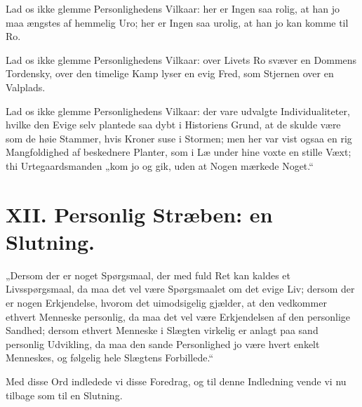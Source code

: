 \documentclass[12pt,a4paper]{book}
\newcommand{\apage}[1]{\marginnote{\footnotesize\textit{[#1]}}}
\begin{document}
Lad os ikke glemme Personlighedens Vilkaar: her er Ingen saa rolig, at
han jo maa ængstes af hemmelig Uro; her er Ingen saa urolig, at han jo
kan komme til Ro.

Lad os ikke glemme Personlighedens Vilkaar: over Livets Ro svæver en
Dommens Tordensky, over den timelige Kamp lyser en evig Fred, som
Stjernen over en Valplads.

Lad os ikke glemme Personlighedens Vilkaar: der vare udvalgte
Individualiteter, hvilke den Evige selv plantede saa dybt i Historiens
Grund, at de skulde være som de høie Stammer, hvis Kroner suse i
Stormen; men her var vist ogsaa en rig Mangfoldighed af beskednere
Planter, som i Læ under hine voxte en stille Væxt; thi Urtegaardsmanden
„kom jo og gik, uden at Nogen mærkede Noget.“

\chapter*{XII. Personlig Stræben: en Slutning.}
\label{ch:forel12}
 \apage{132}

„Dersom der er noget Spørgsmaal, der med fuld Ret kan kaldes et
Livsspørgsmaal, da maa det vel være Spørgsmaalet om det evige
Liv; dersom der er nogen Erkjendelse, hvorom det uimodsigelig
gjælder, at den vedkommer ethvert Menneske personlig, da maa det
vel være Erkjendelsen af den personlige Sandhed; dersom ethvert
Menneske i Slægten virkelig er anlagt paa sand personlig Udvikling,
da maa den sande Personlighed jo være hvert enkelt Menneskes, og
følgelig hele Slægtens Forbillede.“

Med disse Ord indledede vi disse Foredrag, og til denne Indledning
vende vi nu tilbage som til en Slutning.
\end{document}
